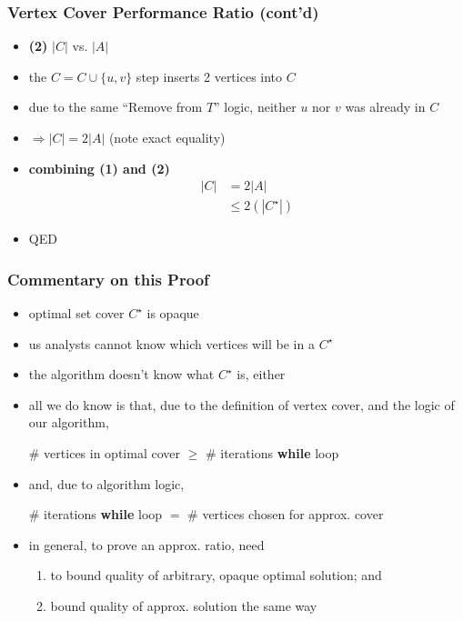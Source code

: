 \documentclass[10pt,aspectratio=169]{beamer}
\begin{document}
      \begin{frame} \frametitle{Vertex Cover Performance Ratio (cont'd)}
      \begin{itemize}
        \item \textbf{(2)} $|C|$ vs. $|A|$
        \item the $C = C \cup \{u, v \}$ step inserts 2 vertices into $C$
        \item  due to the same ``Remove from $T$'' logic, neither $u$ nor $v$ was already
          in $C$
        \item $\Rightarrow |C| = 2|A|$ (note exact equality)
        \item \textbf{combining (1) and (2)}
        \begin{align*}
          |C| &= 2|A| \\
          & \leq 2(|C^\star|)
        \end{align*}
        \item QED
      \end{itemize}
      \end{frame}
      
      \begin{frame} \frametitle{Commentary on this Proof}
      \begin{itemize}
        \item optimal set cover $C^\star$ is opaque
        \item us analysts cannot know which vertices will be in a $C^\star$
        \item the algorithm doesn't know what $C^\star$ is, either
        \item all we do know is that, due to the definition of vertex cover, and
          the logic of our algorithm,
          \begin{center}
            \# vertices in optimal cover $\geq$ \# iterations \textbf{while} loop
          \end{center}
        \item and, due to algorithm logic,
        \begin{center}
            \# iterations \textbf{while} loop $=$ \# vertices chosen for approx. cover
        \end{center}
        \item in general, to prove an approx. ratio, need
        \begin{enumerate}
          \item to bound quality of arbitrary, opaque optimal solution; and
          \item bound quality of approx. solution the same way
        \end{enumerate}
      \end{itemize}
      \end{frame}
\end{document}
